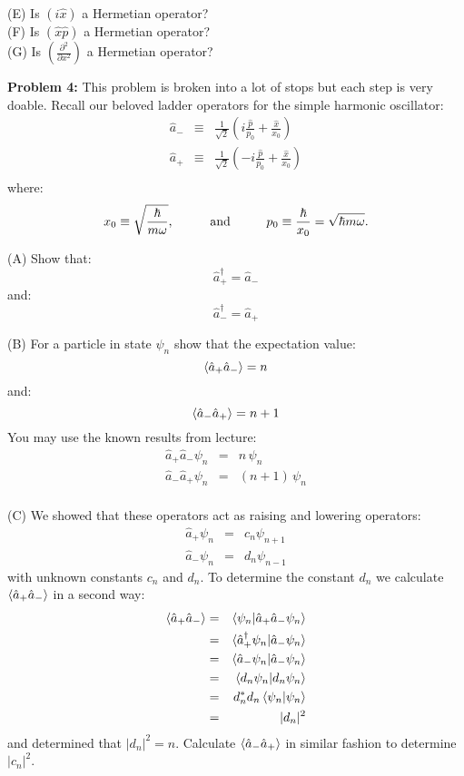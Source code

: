 \documentclass[12pt]{article}
\begin{document}
\noindent
(E) Is $\left(i\hat{x}\right)$ a Hermetian operator?\\[5pt]

\noindent
(F) Is $\left(\hat{x}\hat{p}\right)$ a Hermetian operator?\\[5pt]

\noindent
(G) Is $\left(\frac{\partial^2}{\partial x^2}\right)$ a Hermetian operator?\\[5pt]

\newpage

\noindent
{\bf Problem 4:}  This problem is broken into a lot of stops but each step is very doable.  Recall our beloved ladder operators for the simple harmonic oscillator:
\begin{eqnarray*}
\hat{a}_- &\equiv& \frac{1}{\sqrt{2}}\left(i \frac{\hat{p}}{p_0} + \frac{\hat{x}}{x_0}\right) \\
\hat{a}_+ &\equiv& \frac{1}{\sqrt{2}}\left(-i \frac{\hat{p}}{p_0} + \frac{\hat{x}}{x_0} \right) \\
\end{eqnarray*}
where:
$$x_0 \equiv \sqrt{\frac{\hbar}{m \omega}}, \hspace{1cm} {\rm and} \hspace{1cm} p_0 \equiv \frac{\hbar}{x_0} = \sqrt{\hbar m \omega}.$$

\noindent
(A) Show that:
$$\hat{a}_+^\dagger = \hat{a}_-$$
and:
$$\hat{a}_-^\dagger = \hat{a}_+$$

\noindent
(B) For a particle in state $\psi_n$ show that the expectation value:
$$\braket{\hat{a}_+\hat{a}_-} = n $$
and:
$$\braket{\hat{a}_-\hat{a}_+} = n+1$$
You may use the known results from lecture:
\begin{eqnarray*}
\hat{a}_+\hat{a}_- \psi_n &=& n \, \psi_{n} \\
\hat{a}_-\hat{a}_+ \psi_n &=& (n+1) \, \psi_{n} \\
\end{eqnarray*}

\noindent
(C) We showed that these operators act as raising and lowering operators:
\begin{eqnarray*}
\hat{a}_+ \psi_n &=& c_n \psi_{n+1} \\
\hat{a}_- \psi_n &=& d_n \psi_{n-1} 
\end{eqnarray*}
with unknown constants $c_n$ and $d_n$.  To determine the constant $d_n$ we calculate $\braket{\hat{a}_+\hat{a}_-}$ in a second way:
\begin{eqnarray*}
\braket{\hat{a}_+\hat{a}_-} &=& \braket{\psi_n | \hat{a}_+ \hat{a}_- \psi_n}\\
 &=& \braket{\hat{a}_+^\dagger \psi_n | \hat{a}_- \psi_n}\\
 &=& \braket{\hat{a}_- \psi_n | \hat{a}_- \psi_n}\\
 &=& \braket{d_n \psi_n | d_n \psi_n}\\
 &=& d_n^* d_n \braket{\psi_n | \psi_n}\\
 &=& |d_n|^2\\ 
\end{eqnarray*}
and determined that $|d_n|^2 = n$.  Calculate 
$\braket{\hat{a}_-\hat{a}_+}$ in similar fashion to determine $|c_n|^2$.\\[5pt]
\end{document}
